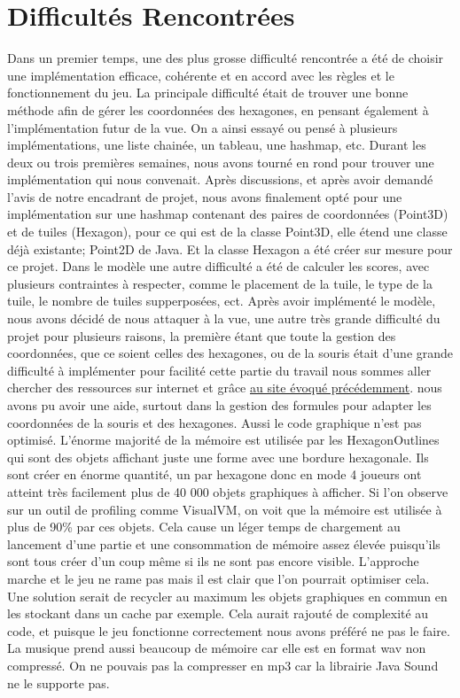 \documentclass{article}
\begin{document}
    \section{Difficultés Rencontrées}\label{sec:difficultes-rencontrees}

    Dans un premier temps, une des plus grosse difficulté rencontrée a été de choisir une implémentation efficace, cohérente et en accord avec les règles et le fonctionnement du jeu.
    La principale difficulté était de trouver une bonne méthode afin de gérer les coordonnées des hexagones, en pensant également à l'implémentation futur de la vue.
    On a ainsi essayé ou pensé à plusieurs implémentations, une liste chainée, un tableau, une hashmap, etc.
    Durant les deux ou trois premières semaines, nous avons tourné en rond pour trouver une implémentation qui nous convenait.
    Après discussions, et après avoir demandé l'avis de notre encadrant de projet, nous avons finalement opté pour une implémentation sur une hashmap contenant des paires de coordonnées (Point3D) et de tuiles (Hexagon), pour ce qui est de la classe Point3D, elle étend une classe déjà existante; Point2D de Java.
    Et la classe Hexagon a été créer sur mesure pour ce projet.
    Dans le modèle une autre difficulté a été de calculer les scores, avec plusieurs contraintes à respecter, comme le placement de la tuile, le type de la tuile, le nombre de tuiles supperposées, ect.
    Après avoir implémenté le modèle, nous avons décidé de nous attaquer à la vue, une autre très grande difficulté du projet pour plusieurs raisons, 
    la première étant que toute la gestion des coordonnées, que ce soient celles des hexagones, ou de la souris était d'une grande difficulté à implémenter pour facilité cette partie du travail nous sommes aller chercher des ressources sur internet et grâce \href{https://www.redblobgames.com/grids/hexagons/}{au site évoqué précédemment}.
    nous avons pu avoir une aide, surtout dans la gestion des formules pour adapter les coordonnées de la souris et des hexagones.
    Aussi le code graphique n'est pas optimisé. L'énorme majorité de la mémoire est utilisée par les HexagonOutlines qui sont des objets affichant juste une forme avec une bordure hexagonale.
    Ils sont créer en énorme quantité, un par hexagone donc en mode 4 joueurs ont atteint très facilement plus de 40 000 objets graphiques à afficher.
    Si l'on observe sur un outil de profiling comme VisualVM, on voit que la mémoire est utilisée à plus de 90\% par ces objets.
    Cela cause un léger temps de chargement au lancement d'une partie et une consommation de mémoire assez élevée puisqu'ils sont tous créer d'un coup même si ils ne sont pas encore visible.
    L'approche marche et le jeu ne rame pas mais il est clair que l'on pourrait optimiser cela. Une solution serait de recycler au maximum les objets graphiques en commun en les stockant dans un cache par exemple.
    Cela aurait rajouté de complexité au code, et puisque le jeu fonctionne correctement nous avons préféré ne pas le faire.
    La musique prend aussi beaucoup de mémoire car elle est en format wav non compressé.
    On ne pouvais pas la compresser en mp3 car la librairie Java Sound ne le supporte pas.
\end{document}
